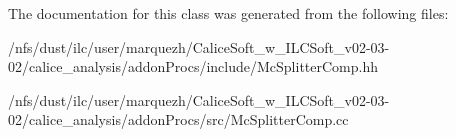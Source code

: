 The documentation for this class was generated from the following files\-:\begin{DoxyCompactItemize}
\item 
/nfs/dust/ilc/user/marquezh/\-Calice\-Soft\-\_\-w\-\_\-\-I\-L\-C\-Soft\-\_\-v02-\/03-\/02/calice\-\_\-analysis/addon\-Procs/include/Mc\-Splitter\-Comp.\-hh\item 
/nfs/dust/ilc/user/marquezh/\-Calice\-Soft\-\_\-w\-\_\-\-I\-L\-C\-Soft\-\_\-v02-\/03-\/02/calice\-\_\-analysis/addon\-Procs/src/Mc\-Splitter\-Comp.\-cc\end{DoxyCompactItemize}
